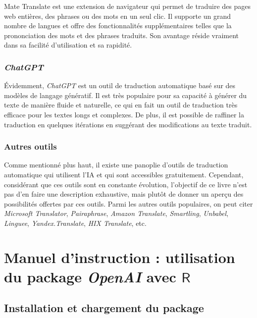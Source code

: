 \documentclass[
  letterpaper,
  DIV=11,
  numbers=noendperiod,
  oneside]{scrreprt}
\begin{document}
Mate Translate est une extension de navigateur qui permet de traduire
des pages web entières, des phrases ou des mots en un seul clic. Il
supporte un grand nombre de langues et offre des fonctionnalités
supplémentaires telles que la prononciation des mots et des phrases
traduits. Son avantage réside vraiment dans sa facilité d'utilisation et
sa rapidité.

\hypertarget{chatgpt}{%
\subsubsection{\texorpdfstring{\emph{ChatGPT}}{ChatGPT}}\label{chatgpt}}

Évidemment, \emph{ChatGPT} est un outil de traduction automatique basé
sur des modèles de langage génératif. Il est très populaire pour sa
capacité à générer du texte de manière fluide et naturelle, ce qui en
fait un outil de traduction très efficace pour les textes longs et
complexes. De plus, il est possible de raffiner la traduction en
quelques itérations en suggérant des modifications au texte traduit.

\hypertarget{autres-outils}{%
\subsubsection{Autres outils}\label{autres-outils}}

Comme mentionné plus haut, il existe une panoplie d'outils de traduction
automatique qui utilisent l'IA et qui sont accessibles gratuitement.
Cependant, considérant que ces outils sont en constante évolution,
l'objectif de ce livre n'est pas d'en faire une description exhaustive,
mais plutôt de donner un aperçu des possibilités offertes par ces
outils. Parmi les autres outils populaires, on peut citer
\emph{Microsoft Translator}, \emph{Pairaphrase}, \emph{Amazon
Translate}, \emph{Smartling}, \emph{Unbabel}, \emph{Linguee},
\emph{Yandex.Translate}, \emph{HIX Translate}, etc.

\hypertarget{manuel-dinstruction-utilisation-du-package-openai-avec-textsfr}{%
\section{\texorpdfstring{Manuel d'instruction : utilisation du package
\emph{OpenAI} avec
\(\textsf{R}\)}{Manuel d'instruction : utilisation du package OpenAI avec \textbackslash textsf\{R\}}}\label{manuel-dinstruction-utilisation-du-package-openai-avec-textsfr}}

\hypertarget{installation-et-chargement-du-package}{%
\subsection{Installation et chargement du
package}\label{installation-et-chargement-du-package}}
\end{document}
